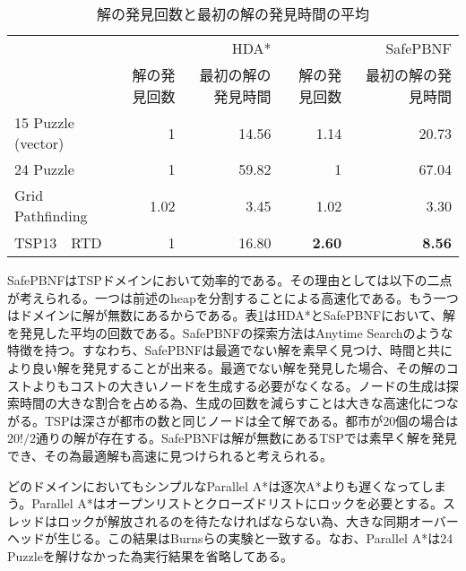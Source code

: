 \documentclass[uplatex]{jsarticle}
\begin{document}

\begin{table}[h]
	\centering
	\begin{tabular}{lrrrr} \hline
		 & &             HDA* & & SafePBNF \\ 
		 &  解の発見回数 & 最初の解の発見時間 & 解の発見回数 & 最初の解の発見時間 \\ \hline
		15 Puzzle (vector)& 1 & 14.56 & 1.14 & 20.73 \\ 
		24 Puzzle & 1 & 59.82 & 1 & 67.04 \\ 
		Grid Pathfinding & 1.02 & 3.45 & 1.02 & 3.30 \\ 
		TSP13　RTD & 1 & 16.80 & \textbf{2.60} & \textbf{8.56} \\ \hline
	\end{tabular}
	\caption{解の発見回数と最初の解の発見時間の平均}
	\label{hdastar_incumbent}
\end{table}


SafePBNFはTSPドメインにおいて効率的である。その理由としては以下の二点が考えられる。一つは前述のheapを分割することによる高速化である。もう一つはドメインに解が無数にあるからである。表\ref{hdastar_incumbent}はHDA*とSafePBNFにおいて、解を発見した平均の回数である。SafePBNFの探索方法はAnytime Searchのような特徴を持つ\cite{Burns2010}。すなわち、SafePBNFは最適でない解を素早く見つけ、時間と共により良い解を発見することが出来る。最適でない解を発見した場合、その解のコストよりもコストの大きいノードを生成する必要がなくなる。ノードの生成は探索時間の大きな割合を占める為、生成の回数を減らすことは大きな高速化につながる。TSPは深さが都市の数と同じノードは全て解である。都市が20個の場合は$20!/2$通りの解が存在する。SafePBNFは解が無数にあるTSPでは素早く解を発見でき、その為最適解も高速に見つけられると考えられる。
\newline

どのドメインにおいてもシンプルなParallel A*は逐次A*よりも遅くなってしまう。Parallel A*はオープンリストとクローズドリストにロックを必要とする。スレッドはロックが解放されるのを待たなければならない為、大きな同期オーバーヘッドが生じる。この結果はBurnsらの実験と一致する\cite{Burns2010}。なお、Parallel A*は24 Puzzleを解けなかった為実行結果を省略してある。
\newline
\end{document}
